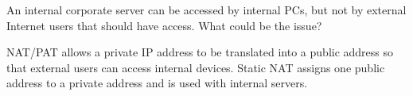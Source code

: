 \begin{example}
An internal corporate server can be accessed by internal PCs, but not by external Internet users that should have access. What could be the issue?
\end{example}

\begin{solution}
NAT/PAT allows a private IP address to be translated into a public address so that external users can access internal devices. Static NAT assigns one public address to a private address and is used with internal servers.
\end{solution}
